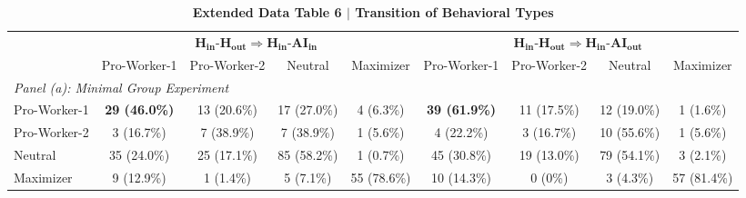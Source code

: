 \begin{table}[htbp]
\centering
\caption{\textbf{Extended Data Table 6 $\vert$ Transition of Behavioral Types}}
\label{tab:transition_types}
\small
\setlength{\tabcolsep}{4pt}
\begin{tabular}{lcccccccc}
\toprule\toprule
 & \multicolumn{4}{c}{$\mathbf{H_{in}}$-$\mathbf{H_{out}} \Rightarrow \mathbf{H_{in}}$-$\mathbf{AI_{in}}$} & \multicolumn{4}{c}{$\mathbf{H_{in}}$-$\mathbf{H_{out}} \Rightarrow \mathbf{H_{in}}$-$\mathbf{AI_{out}}$} \\
\cmidrule(lr){2-5} \cmidrule(lr){6-9}
 & Pro-Worker-1 & Pro-Worker-2 & Neutral & Maximizer & Pro-Worker-1 & Pro-Worker-2 & Neutral & Maximizer \\
\midrule
\multicolumn{9}{l}{\emph{Panel (a): Minimal Group Experiment}} \\
\quad Pro-Worker-1 & \textbf{29 (46.0\%)} & 13 (20.6\%) & 17 (27.0\%) & 4 (6.3\%) & \textbf{39 (61.9\%)} & 11 (17.5\%) & 12 (19.0\%) & 1 (1.6\%) \\
\quad Pro-Worker-2 & 3 (16.7\%) & 7 (38.9\%) & 7 (38.9\%) & 1 (5.6\%) & 4 (22.2\%) & 3 (16.7\%) & 10 (55.6\%) & 1 (5.6\%) \\
\quad Neutral & 35 (24.0\%) & 25 (17.1\%) & 85 (58.2\%) & 1 (0.7\%) & 45 (30.8\%) & 19 (13.0\%) & 79 (54.1\%) & 3 (2.1\%) \\
\quad Maximizer & 9 (12.9\%) & 1 (1.4\%) & 5 (7.1\%) & 55 (78.6\%) & 10 (14.3\%) & 0 (0\%) & 3 (4.3\%) & 57 (81.4\%) \\
\bottomrule\bottomrule
\end{tabular}
\end{table}